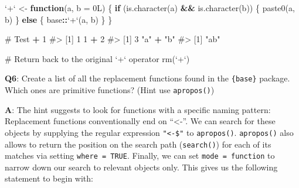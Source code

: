 \documentclass[
]{krantz}
\makeatletter
\newenvironment{Shaded}{\begin{snugshade}}{\end{snugshade}}
\newcommand{\CommentTok}[1]{\textcolor[rgb]{0.56,0.35,0.01}{\textit{#1}}}
\newcommand{\ControlFlowTok}[1]{\textcolor[rgb]{0.13,0.29,0.53}{\textbf{#1}}}
\newcommand{\DataTypeTok}[1]{\textcolor[rgb]{0.13,0.29,0.53}{#1}}
\newcommand{\DecValTok}[1]{\textcolor[rgb]{0.00,0.00,0.81}{#1}}
\newcommand{\KeywordTok}[1]{\textcolor[rgb]{0.13,0.29,0.53}{\textbf{#1}}}
\newcommand{\NormalTok}[1]{#1}
\newcommand{\OperatorTok}[1]{\textcolor[rgb]{0.81,0.36,0.00}{\textbf{#1}}}
\newcommand{\StringTok}[1]{\textcolor[rgb]{0.31,0.60,0.02}{#1}}
\newenvironment{kframe}{%
\medskip{}
\setlength{\fboxsep}{.8em}
 \def\at@end@of@kframe{}%
 \ifinner\ifhmode%
  \def\at@end@of@kframe{\end{minipage}}%
  \begin{minipage}{\columnwidth}%
 \fi\fi%
 \def\FrameCommand##1{\hskip\@totalleftmargin \hskip-\fboxsep
 \colorbox{shadecolor}{##1}\hskip-\fboxsep
     \hskip-\linewidth \hskip-\@totalleftmargin \hskip\columnwidth}%
 \MakeFramed {\advance\hsize-\width
   \@totalleftmargin\z@ \linewidth\hsize
   \@setminipage}}%
 {\par\unskip\endMakeFramed%
 \at@end@of@kframe}
\renewenvironment{Shaded}{\begin{kframe}}{\end{kframe}}
\renewcommand{\KeywordTok} [1]{\textcolor[rgb]{0.00,0.44,0.13}{{#1}}}
\renewcommand{\DataTypeTok}[1]{\textcolor[rgb]{0.56,0.13,0.00}{{#1}}}
\renewcommand{\DecValTok}  [1]{\textcolor[rgb]{0.25,0.63,0.44}{{#1}}}
\renewcommand{\StringTok}  [1]{\textcolor[rgb]{0.25,0.44,0.63}{{#1}}}
\renewcommand{\CommentTok} [1]{\textcolor[rgb]{0.38,0.63,0.69}{{#1}}}
\renewcommand{\NormalTok}  [1]{{#1}}
\makeatother
\begin{document}
\begin{Shaded}
\begin{Highlighting}[]
\StringTok{`}\DataTypeTok{+}\StringTok{`}\NormalTok{ <-}\StringTok{ }\ControlFlowTok{function}\NormalTok{(a, }\DataTypeTok{b =}\NormalTok{ 0L) \{}
  \ControlFlowTok{if}\NormalTok{ (}\KeywordTok{is.character}\NormalTok{(a) }\OperatorTok{&&}\StringTok{ }\KeywordTok{is.character}\NormalTok{(b)) \{}
    \KeywordTok{paste0}\NormalTok{(a, b)}
\NormalTok{  \} }\ControlFlowTok{else}\NormalTok{ \{}
\NormalTok{    base}\OperatorTok{::}\StringTok{`}\DataTypeTok{+}\StringTok{`}\NormalTok{(a, b)}
\NormalTok{  \}}
\NormalTok{\}}

\CommentTok{# Test}
\OperatorTok{+}\StringTok{ }\DecValTok{1}
\CommentTok{#> [1] 1}
\DecValTok{1} \OperatorTok{+}\StringTok{ }\DecValTok{2}
\CommentTok{#> [1] 3}
\StringTok{"a"} \OperatorTok{+}\StringTok{ "b"}
\CommentTok{#> [1] "ab"}

\CommentTok{# Return back to the original `+` operator}
\KeywordTok{rm}\NormalTok{(}\StringTok{`}\DataTypeTok{+}\StringTok{`}\NormalTok{)}
\end{Highlighting}
\end{Shaded}

\textbf{{Q6}}: Create a list of all the replacement functions found in the \texttt{\{base\}} package. Which ones are primitive functions? (Hint use \texttt{apropos()})

\textbf{{A}}: The hint suggests to look for functions with a specific naming pattern: Replacement functions conventionally end on ``\textless-''. We can search for these objects by supplying the regular expression \texttt{"\textless{}-\$"} to \texttt{apropos()}. \texttt{apropos()} also allows to return the position on the search path (\texttt{search()}) for each of its matches via setting \texttt{where\ =\ TRUE}. Finally, we can set \texttt{mode\ =\ function} to narrow down our search to relevant objects only. This gives us the following statement to begin with:
\end{document}
